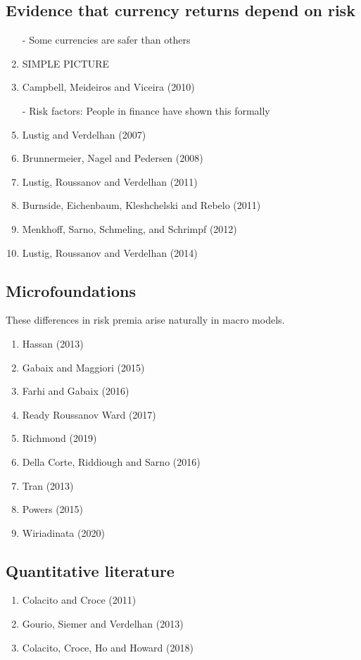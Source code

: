 \documentclass[12pt,letter]{article}
\theoremstyle{break} \theorembodyfont{\normalfont\itshape}
\theoremstyle{break}
\theoremstyle{break} \theorembodyfont{\normalfont\itshape}
\theoremstyle{break} \theorembodyfont{\normalfont\itshape}
\begin{document}
\subsection{Evidence that currency returns depend on risk}
\begin{enumerate}
\item[-] Some currencies are safer than others
\item SIMPLE PICTURE
\item Campbell, Meideiros and Viceira (2010)
\item[-] Risk factors: People in finance have shown this formally
\item Lustig and Verdelhan (2007)
\item Brunnermeier, Nagel and Pedersen (2008)
\item Lustig, Roussanov and Verdelhan (2011)
\item Burnside, Eichenbaum, Kleshchelski and Rebelo (2011)
\item Menkhoff, Sarno, Schmeling, and Schrimpf (2012)
\item Lustig, Roussanov and Verdelhan (2014)
\end{enumerate}

\subsection{Microfoundations}
These differences in risk premia arise naturally in macro models.
\begin{enumerate}
\item Hassan (2013)
\item Gabaix and Maggiori (2015)
\item Farhi and Gabaix (2016)
\item Ready Roussanov Ward (2017)
\item Richmond (2019)
\item Della Corte, Riddiough and Sarno (2016)
\item Tran (2013)
\item Powers (2015)
\item Wiriadinata (2020)
\end{enumerate}

\subsection{Quantitative literature}
\begin{enumerate}
\item Colacito and Croce (2011)
\item Gourio, Siemer and Verdelhan (2013)
\item Colacito, Croce, Ho and Howard (2018)
\end{enumerate}
\end{document}
